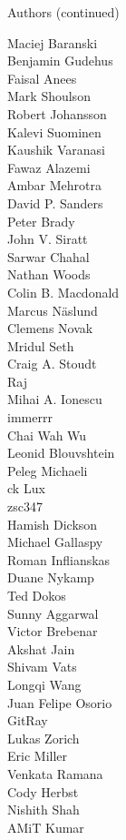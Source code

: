 \begin{frame}{Authors (continued)}
\begin{multicols}{5}
\tiny
Maciej Baranski\\
Benjamin Gudehus\\
Faisal Anees\\
Mark Shoulson\\
Robert Johansson\\
Kalevi Suominen\\
Kaushik Varanasi\\
Fawaz Alazemi\\
Ambar Mehrotra\\
David P. Sanders\\
Peter Brady\\
John V. Siratt\\
Sarwar Chahal\\
Nathan Woods\\
Colin B. Macdonald\\
Marcus Näslund\\
Clemens Novak\\
Mridul Seth\\
Craig A. Stoudt\\
Raj\\
Mihai A. Ionescu\\
immerrr\\
Chai Wah Wu\\
Leonid Blouvshtein\\
Peleg Michaeli\\
ck Lux\\
zsc347\\
Hamish Dickson\\
Michael Gallaspy\\
Roman Inflianskas\\
Duane Nykamp\\
Ted Dokos\\
Sunny Aggarwal\\
Victor Brebenar\\
Akshat Jain\\
Shivam Vats\\
Longqi Wang\\
Juan Felipe Osorio\\
GitRay\\
Lukas Zorich\\
Eric Miller\\
Venkata Ramana\\
Cody Herbst\\
Nishith Shah\\
AMiT Kumar\\

\end{multicols}
\end{frame}
